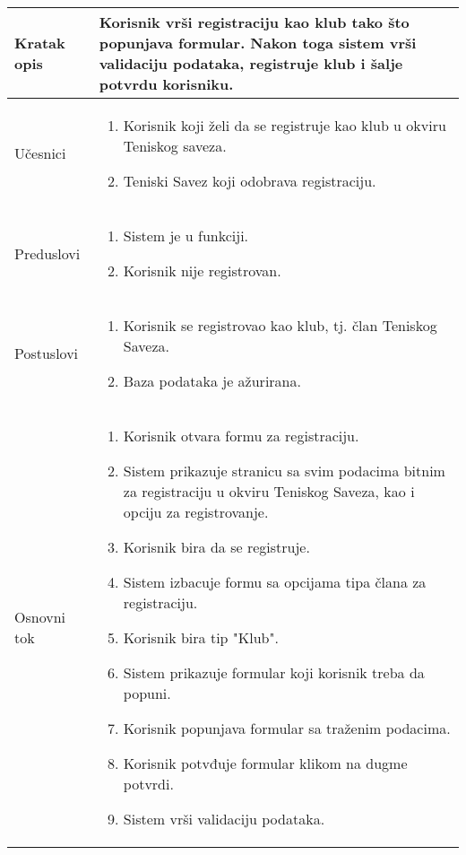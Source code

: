 \documentclass{article}
\begin{document}
\begin{longtable}{| p{} | p{} |} 
\hline
    Kratak opis & Korisnik vrši registraciju kao klub tako što popunjava formular. Nakon toga sistem vrši validaciju podataka, registruje klub i šalje potvrdu korisniku.\\ 
\hline    
    Učesnici & \begin{enumerate}
        \item Korisnik koji želi da se registruje kao klub u okviru Teniskog saveza.
        \item Teniski Savez koji odobrava registraciju. 
    \end{enumerate}
    \\
\hline
   Preduslovi & \begin{enumerate}
       \item Sistem je u funkciji.
       \item Korisnik nije registrovan.
   \end{enumerate}\\
\hline  
    Postuslovi & \begin{enumerate}
        \item Korisnik se registrovao kao klub, tj. član Teniskog Saveza.
        \item Baza podataka je ažurirana.
    \end{enumerate}\\
\hline
    Osnovni tok & \begin{enumerate}
        \item Korisnik otvara formu za registraciju.
        \item Sistem prikazuje stranicu sa svim podacima bitnim za registraciju u okviru Teniskog Saveza, kao i opciju za registrovanje.
        \item Korisnik bira da se registruje.
        \item Sistem izbacuje formu sa opcijama tipa člana za registraciju.
        \item Korisnik bira tip "Klub".
        \item Sistem prikazuje formular koji korisnik treba da popuni.
        \item Korisnik popunjava formular sa traženim podacima.
        \item Korisnik potvđuje formular klikom na dugme potvrdi.
        \item Sistem vrši validaciju podataka.

\end{enumerate}
\end{longtable}
\end{document}
